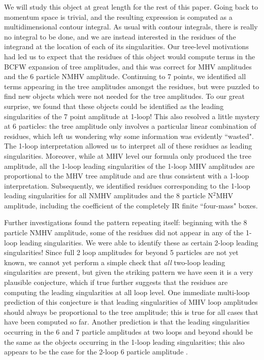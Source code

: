 \documentclass[12pt]{article}
\begin{document}
We will study this object at great length for the rest of this paper. Going back to momentum space is trivial, and the resulting expression is computed as a multidimensional contour integral. As usual with contour integrals, there is really no integral to be done, and we are instead interested in the residues of the integrand at the location of each of its singularities.
Our tree-level motivations had led us to expect that the residues of this object would compute terms in the BCFW expansion of tree amplitudes, and this was correct for MHV amplitudes and the 6 particle NMHV amplitude. Continuing to 7 points, we identified all terms appearing in the tree amplitudes amongst the residues, but were puzzled to find new objects which were not needed for the tree amplitudes. To our great surprise, we found that these objects could be identified as the leading singularities of the 7 point amplitude at 1-loop! This also resolved a little mystery at 6 particles: the tree amplitude only involves a particular linear combination of residues, which left us wondering why some information was evidently ``wasted".  The 1-loop interpretation allowed us to interpret all of these residues as leading singularities. Moreover, while at MHV level our formula only produced the tree amplitude, all the 1-loop leading singularities of the 1-loop MHV amplitudes are proportional to the MHV tree amplitude and are thus consistent with a 1-loop interpretation.  Subsequently, we identified residues corresponding to  the 1-loop leading singularities for all NMHV amplitudes and the 8 particle N$^2$MHV amplitude, including the coefficient of the completely IR finite ``four-mass" boxes.

Further investigations found the pattern repeating itself: beginning with the 8 particle NMHV amplitude, some of the residues did not appear in any of the 1-loop leading singularities. We were able to identify these as certain 2-loop leading singularities! Since full 2 loop amplitudes for beyond 5 particles are not yet known, we cannot yet perform a simple check that {\it all} two-loop leading singularities are present, but given the striking pattern we have seen it is a very plausible conjecture, which if true further suggests that the residues are computing the leading singularities at all loop level. One immediate multi-loop prediction of this conjecture is that leading singularities of MHV loop amplitudes should always be proportional to the tree amplitude; this is true for all cases that have been computed so far. Another prediction is that the leading singularities occurring in the 6 and 7 particle amplitudes at two loops and beyond should be the same
as the objects occurring in the 1-loop leading singularities; this also appears to be the case for the 2-loop 6 particle amplitude \cite{vergu}.
\end{document}
